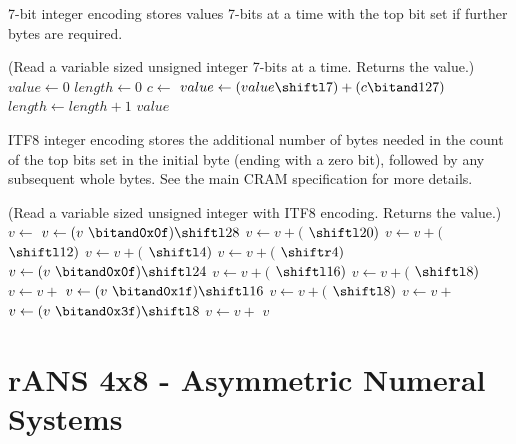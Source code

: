 \documentclass[a4paper]{article}
\begin{document}
7-bit integer encoding stores values 7-bits at a time with the top bit
set if further bytes are required.

\begin{algorithmic}[1]
\Statex
\Statex (Read a variable sized unsigned integer 7-bits at a time.  Returns the value.)
 
  \State $value \gets 0$
  \State $length \gets 0$
  \Repeat
    \State $c \gets$ 
    \State $value \gets (value \shiftl 7) + (c \bitand 127)$
    \State $length \gets length + 1$
  \State \Return $value$
  \EndFunction
\end{algorithmic}

ITF8 integer encoding stores the additional number of bytes needed in
the count of the top bits set in the initial byte (ending with a zero
bit), followed by any subsequent whole bytes.  See the main CRAM
specification for more details.

\begin{algorithmic}[1]
\Statex
\Statex (Read a variable sized unsigned integer with ITF8 encoding.  Returns the value.)
 
  \State $v \gets$ 
    \State $v \gets (v\ \bitand \mathtt{0x0f}) \shiftl 28$
    \State $v \gets v + ($  $\shiftl 20)$
    \State $v \gets v + ($  $\shiftl 12)$
    \State $v \gets v + ($  $\shiftl  4)$
    \State $v \gets v + ($  $\shiftr  4)$
    \State $v \gets (v\ \bitand \mathtt{0x0f}) \shiftl 24$
    \State $v \gets v + ($  $\shiftl 16)$
    \State $v \gets v + ($  $\shiftl 8)$
    \State $v \gets v + $ 
    \State $v \gets (v\ \bitand \mathtt{0x1f}) \shiftl 16$
    \State $v \gets v + ($  $\shiftl 8)$
    \State $v \gets v + $ 
    \State $v \gets (v\ \bitand \mathtt{0x3f}) \shiftl 8$
    \State $v \gets v + $ 
  \EndIf
  \State \Return $v$
  \EndFunction
\end{algorithmic}

\section{rANS 4x8 - Asymmetric Numeral Systems}
\end{document}

